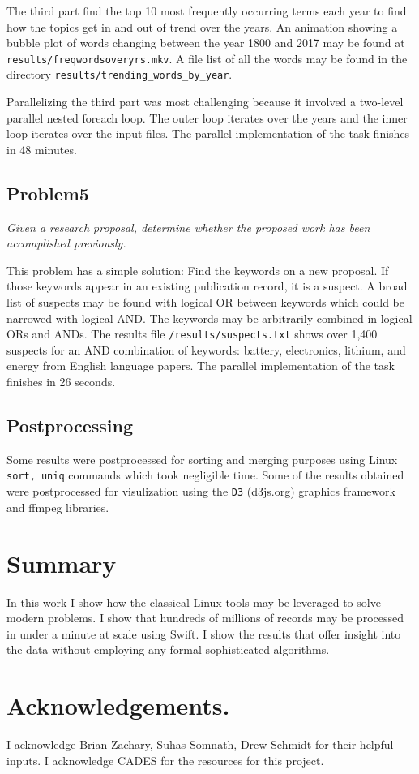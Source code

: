 \documentclass{article}
\begin{document}
The third part find the top 10 most frequently occurring terms each year to
find how the topics get in and out of trend over the years. An animation
showing a bubble plot of words changing between the year 1800 and 2017 may be
found at \texttt{results/freqwordsoveryrs.mkv}. A file list of all the words
may be found in the directory \texttt{results/trending\_words\_by\_year}.

Parallelizing the third part was most challenging because it involved a
two-level parallel nested foreach loop.  The outer loop iterates over the years
and the inner loop iterates over the input files. The parallel implementation
of the task finishes in 48 minutes.

\subsection*{Problem5}
\textit{Given a research proposal, determine whether the proposed work has been
accomplished previously.}

This problem has a simple solution: Find the keywords on a new proposal. If
those keywords appear in an existing publication record, it is a suspect. A
broad list of suspects may be found with logical OR between keywords which
could be narrowed with logical AND. The keywords may be arbitrarily combined in
logical ORs and ANDs. The results file \texttt{/results/suspects.txt} shows
over 1,400 suspects for an AND combination of keywords:  battery, electronics,
lithium, and energy from English language papers. The parallel implementation
of the task finishes in 26 seconds.

\subsection*{Postprocessing}
Some results were postprocessed for sorting and merging purposes using Linux
\texttt{sort, uniq} commands which took negligible time. Some of the results
obtained were postprocessed for visulization using the \texttt{D3} (d3js.org)
graphics framework and ffmpeg libraries.


\section*{Summary}
In this work I show how the classical Linux tools may be leveraged to solve
modern problems. I show that hundreds of millions of records may be processed
in under a minute at scale using Swift. I show the results that offer insight
into the data without employing any formal sophisticated algorithms.

\section*{Acknowledgements.}
I acknowledge Brian Zachary, Suhas Somnath, Drew Schmidt for their helpful
inputs. I acknowledge CADES for the resources for this project.
\end{document}
